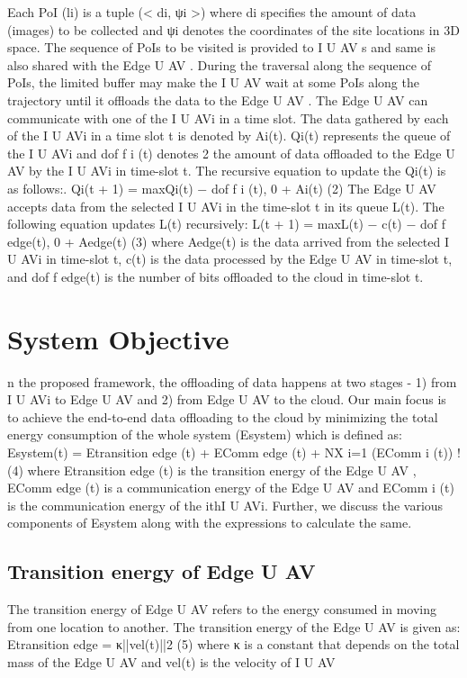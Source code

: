 \documentclass{article}
\begin{document}
\begin{multicols}{2}
Each PoI (li) is a tuple (< di, ψi >) where di specifies the
amount of data (images) to be collected and ψi denotes the
coordinates of the site locations in 3D space. The sequence
of PoIs to be visited is provided to I U AV s and same is
also shared with the Edge U AV . During the traversal
along the sequence of PoIs, the limited buffer may make
the I U AV wait at some PoIs along the trajectory until
it offloads the data to the Edge U AV .
The Edge U AV can communicate with one of the
I U AVi in a time slot. The data gathered by each of
the I U AVi in a time slot t is denoted by Ai(t). Qi(t)
represents the queue of the I U AVi and dof f
i (t) denotes
2
the amount of data offloaded to the Edge U AV by the
I U AVi in time-slot t. The recursive equation to update
the Qi(t) is as follows:.
Qi(t + 1) = max{Qi(t) − dof f
i (t), 0} + Ai(t) (2)
The Edge U AV accepts data from the selected I U AVi
in the time-slot t in its queue L(t). The following equation
updates L(t) recursively:
L(t + 1) = max{L(t) − c(t) − dof f
edge(t), 0} + Aedge(t) (3)
where Aedge(t) is the data arrived from the selected
I U AVi in time-slot t, c(t) is the data processed by the
Edge U AV in time-slot t, and dof f
edge(t) is the number of
bits offloaded to the cloud in time-slot t.

\section{System Objective}
n the proposed framework, the offloading of data happens
at two stages - 1) from I U AVi to Edge U AV and 2) from
Edge U AV to the cloud. Our main focus is to achieve the
end-to-end data offloading to the cloud by minimizing the
total energy consumption of the whole system (Esystem)
which is defined as:
Esystem(t) = Etransition
edge (t) + EComm
edge (t)
+
NX
i=1
(EComm
i (t))
! (4)
where Etransition
edge (t) is the transition energy of the
Edge U AV , EComm
edge (t) is a communication energy of the
Edge U AV and EComm
i (t) is the communication energy
of the ithI U AVi.
Further, we discuss the various components of Esystem
along with the expressions to calculate the same.
\subsection{Transition energy of Edge U AV}
The transition energy of Edge U AV refers to the energy
consumed in moving from one location to another. The
transition energy of the Edge U AV is given as:
Etransition
edge = κ||vel(t)||2 (5)
where κ is a constant that depends on the total mass of
the Edge U AV and vel(t) is the velocity of I U AV


\end{multicols}
\end{document}
